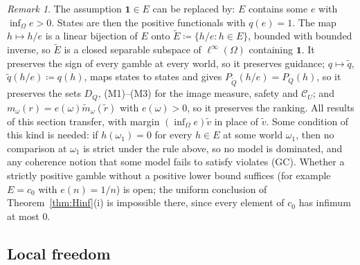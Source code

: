 \documentclass[11pt]{article}
\newcommand{\one}{\mathbf{1}}
\newcommand{\CC}{\mathcal{C}}
\theoremstyle{plain}
\theoremstyle{definition}
\theoremstyle{remark}
\newtheorem{remark}[theorem]{Remark}
\begin{document}
\begin{remark}\label{rem:orderunit}
The assumption $\one\in E$ can be replaced by: $E$ contains some $e$ with $\inf_\Omega e>
0$. States are then the positive functionals with $q(e)=1$. The map $h\mapsto h/e$ is a
linear bijection of $E$ onto $\tilde E\coloneqq\{h/e:h\in E\}$, bounded with bounded
inverse, so $\tilde E$ is a closed separable subspace of $\ell^\infty(\Omega)$ containing
$\one$. It preserves the sign of every gamble at every world, so it preserves guidance;
$q\mapsto\tilde q$, $\tilde q(h/e)\coloneqq q(h)$, maps states to states and gives
$P_{\tilde Q}(h/e)=P_Q(h)$, so it preserves the sets $D_Q$, (M1)--(M3) for the image
measure, safety and $\CC_U$; and $m_\omega(r)=e(\omega)\tilde m_\omega(\tilde r)$ with
$e(\omega)>0$, so it preserves the ranking. All results of this section transfer, with
margin $(\inf_\Omega e)\tilde v$ in place of $\tilde v$. Some condition of this kind is
needed: if $h(\omega_1)=0$ for every $h\in E$ at some world $\omega_1$, then no comparison at
$\omega_1$ is strict under the rule above, so no model is dominated, and any coherence
notion that some model fails to satisfy violates (GC). Whether a strictly positive gamble
without a positive lower bound suffices (for example $E=c_0$ with $e(n)=1/n$) is open; the
uniform conclusion of Theorem~\ref{thm:Hinf}(i) is impossible there, since every element of
$c_0$ has infimum at most $0$.
\end{remark}

\subsection{Local freedom}\label{subsec:inf-LF}
\end{document}

